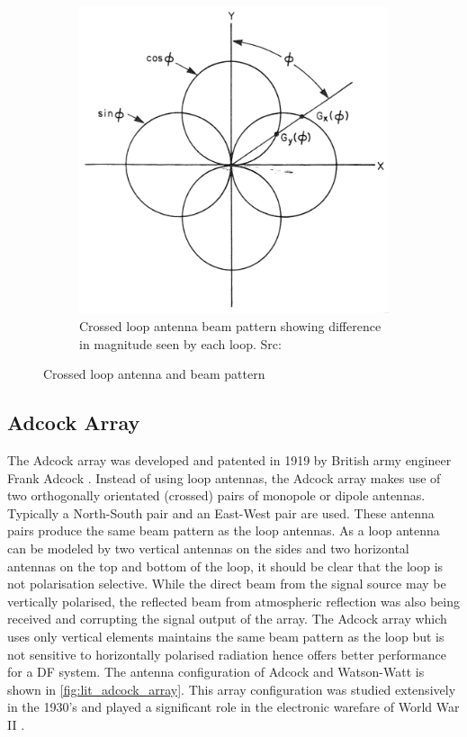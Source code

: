 \begin{figure}
\begin{subfigure}[b]{0.4\textwidth}
    \includegraphics[width=\textwidth]{./img/lit_review/loop_antenna_crossed_beam}
    \caption{Crossed loop antenna beam pattern showing difference in magnitude seen by each loop. Src: \cite{jenkins1991smallaperture}}
  \end{subfigure}
  \caption{Crossed loop antenna and beam pattern}
  \label{fig:lit_crossed_loop_antenna}
\end{figure}

\subsection{Adcock Array}
The Adcock array was developed and patented in 1919 by British army engineer Frank Adcock \cite{gething1991radio}.
Instead of using loop antennas, the Adcock array makes use of two orthogonally orientated (crossed) pairs of monopole or dipole antennas. Typically a North-South pair and an East-West pair are used. These antenna pairs produce the same beam pattern as the loop antennas. 
As a loop antenna can be modeled by two vertical antennas on the sides and two horizontal antennas on the top and bottom of the loop, it should be clear that the loop is not polarisation selective. While the direct beam from the signal source may be vertically polarised, the reflected beam from atmospheric reflection was also being received and corrupting the signal output of the array.
The Adcock array which uses only vertical elements maintains the same beam pattern as the loop but is not sensitive to horizontally polarised radiation hence offers better performance for a DF system.
The antenna configuration of Adcock and Watson-Watt is shown in \autoref{fig:lit_adcock_array}.
This array configuration was studied extensively in the 1930's and played a significant role in the electronic warefare of World War II \cite{gething1991radio}.

